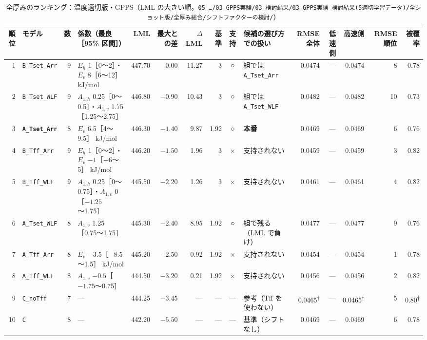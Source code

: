 \documentclass[paper=a4paper,landscape,fontsize=10pt,line_length=62zw,number_of_lines=34]{jlreq}
\let\origtextbf\textbf
\renewcommand{\textbf}[1]{\origtextbf{\gtfamily #1}}   %
\begin{document}
\begin{table}[H]\centering\footnotesize
\caption{全厚みのランキング：温度適切版・GPPS（LML の大きい順。\texttt{05\_\allowbreak{}…/\allowbreak{}03\_\allowbreak{}GPPS実験/\allowbreak{}03\_\allowbreak{}検討結果/\allowbreak{}03\_\allowbreak{}GPPS実験\_\allowbreak{}検討結果(5適切学習データ)/\allowbreak{}全ショット版/\allowbreak{}全厚み総合/\allowbreak{}シフトファクターの検討/\allowbreak{}}）}
\begin{tabular}{rlrp{12\zw}rrrrcp{8.5\zw}rrrrr}
\toprule
順位 & モデル & 数 & 係数（最良［95\% 区間］） & LML & 最大との差 & $\Delta$LML & 基準 & 支持 & 候補の選び方での扱い & RMSE 全体 & 低速側 & 高速側 & RMSE 順位 & 被覆率 \\
\midrule
1 & \texttt{B\_\allowbreak{}Tset\_\allowbreak{}Arr} & 9 & $E_h$ 1［0〜2］・$E_v$ 8［6〜12］ kJ/mol & 447.70 & 0.00 & 11.27 & 3 & ○ & 組では \texttt{A\_\allowbreak{}Tset\_\allowbreak{}Arr} & 0.0474 & --- & 0.0474 & 8 & 0.78 \\
2 & \texttt{B\_\allowbreak{}Tset\_\allowbreak{}WLF} & 9 & $A_{1,h}$ 0.25［0〜0.5］・$A_{1,v}$ 1.75［1.25〜2.75］ & 446.80 & $-0.90$ & 10.43 & 3 & ○ & 組では \texttt{A\_\allowbreak{}Tset\_\allowbreak{}WLF} & 0.0482 & --- & 0.0482 & 10 & 0.73 \\
3 & \textbf{\texttt{A\_\allowbreak{}Tset\_\allowbreak{}Arr}} & 8 & $E_v$ 6.5［4〜9.5］ kJ/mol & 446.30 & $-1.40$ & 9.87 & 1.92 & ○ & \textbf{本番} & 0.0469 & --- & 0.0469 & 6 & 0.76 \\
4 & \texttt{B\_\allowbreak{}Tff\_\allowbreak{}Arr} & 9 & $E_h$ 1［0〜2］・$E_v$ $-1$［$-6$〜5］ kJ/mol & 446.20 & $-1.50$ & 1.96 & 3 & × & 支持されない & 0.0459 & --- & 0.0459 & 3 & 0.82 \\
5 & \texttt{B\_\allowbreak{}Tff\_\allowbreak{}WLF} & 9 & $A_{1,h}$ 0.25［0〜0.75］・$A_{1,v}$ 0［$-1.25$〜1.75］ & 445.50 & $-2.20$ & 1.26 & 3 & × & 支持されない & 0.0461 & --- & 0.0461 & 4 & 0.82 \\
6 & \texttt{A\_\allowbreak{}Tset\_\allowbreak{}WLF} & 8 & $A_{1,v}$ 1.25［0.75〜1.75］ & 445.30 & $-2.40$ & 8.95 & 1.92 & ○ & 組で残る（LML で負け） & 0.0477 & --- & 0.0477 & 9 & 0.76 \\
7 & \texttt{A\_\allowbreak{}Tff\_\allowbreak{}Arr} & 8 & $E_v$ $-3.5$［$-8.5$〜1.5］ kJ/mol & 445.20 & $-2.50$ & 0.92 & 1.92 & × & 支持されない & 0.0454 & --- & 0.0454 & 1 & 0.78 \\
8 & \texttt{A\_\allowbreak{}Tff\_\allowbreak{}WLF} & 8 & $A_{1,v}$ $-0.5$［$-1.75$〜0.75］ & 444.50 & $-3.20$ & 0.21 & 1.92 & × & 支持されない & 0.0456 & --- & 0.0456 & 2 & 0.82 \\
9 & \texttt{C\_\allowbreak{}noTff} & 7 & --- & 444.25 & $-3.45$ & --- & --- & --- & 参考（Tff を使わない） & 0.0465\textsuperscript{†} & --- & 0.0465\textsuperscript{†} & 5 & 0.80\textsuperscript{†} \\
10 & \texttt{C} & 8 & --- & 442.20 & $-5.50$ & --- & --- & --- & 基準（シフトなし） & 0.0469 & --- & 0.0469 & 6 & 0.78 \\
\bottomrule
\end{tabular}
\end{table}
\end{document}
